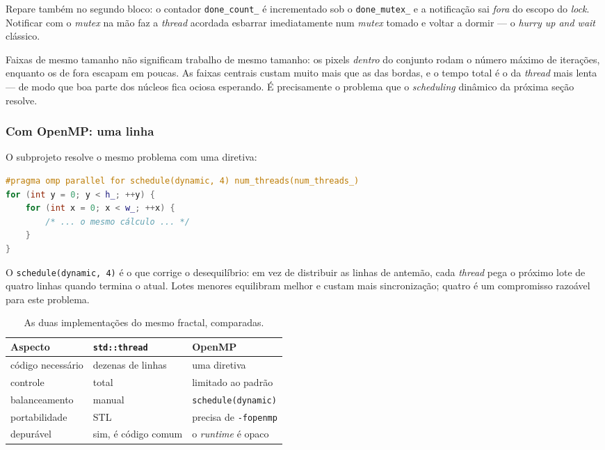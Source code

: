 Repare também no segundo bloco: o contador \texttt{done\_count\_} é incrementado
sob o \texttt{done\_mutex\_} e a notificação sai \emph{fora} do escopo do
\emph{lock}. Notificar com o \emph{mutex} na mão faz a \emph{thread} acordada
esbarrar imediatamente num \emph{mutex} tomado e voltar a dormir --- o
\emph{hurry up and wait} clássico.

\begin{armadilha}
Faixas de mesmo tamanho não significam trabalho de mesmo tamanho: os pixels
\emph{dentro} do conjunto rodam o número máximo de iterações, enquanto os de
fora escapam em poucas. As faixas centrais custam muito mais que as das bordas,
e o tempo total é o da \emph{thread} mais lenta --- de modo que boa parte dos
núcleos fica ociosa esperando. É precisamente o problema que o
\emph{scheduling} dinâmico da próxima seção resolve.
\end{armadilha}

\subsubsection{Com OpenMP: uma linha}

O subprojeto  resolve o mesmo problema com uma
diretiva:

\begin{lstlisting}[style=bt, language=C++,
    caption={A diretiva que substitui a criação, a divisão e a espera.}]
#pragma omp parallel for schedule(dynamic, 4) num_threads(num_threads_)
for (int y = 0; y < h_; ++y) {
    for (int x = 0; x < w_; ++x) {
        /* ... o mesmo cálculo ... */
    }
}
\end{lstlisting}

O \texttt{schedule(dynamic, 4)} é o que corrige o desequilíbrio: em vez de
distribuir as linhas de antemão, cada \emph{thread} pega o próximo lote de
quatro linhas quando termina o atual. Lotes menores equilibram melhor e custam
mais sincronização; quatro é um compromisso razoável para este problema.

\begin{table}[htbp]
\centering
\caption{As duas implementações do mesmo fractal, comparadas.}
\label{tab:mandelbrot-comparacao}
\footnotesize
\begin{tabular}{@{}lll@{}}
\toprule
\textbf{Aspecto} & \texttt{std::thread} & \textbf{OpenMP} \\
\midrule
código necessário    & dezenas de linhas       & uma diretiva \\
controle             & total                   & limitado ao padrão \\
balanceamento        & manual                  & \texttt{schedule(dynamic)} \\
portabilidade        & STL                     & precisa de \texttt{-fopenmp} \\
depurável            & sim, é código comum     & o \emph{runtime} é opaco \\
\bottomrule
\end{tabular}
\end{table}

